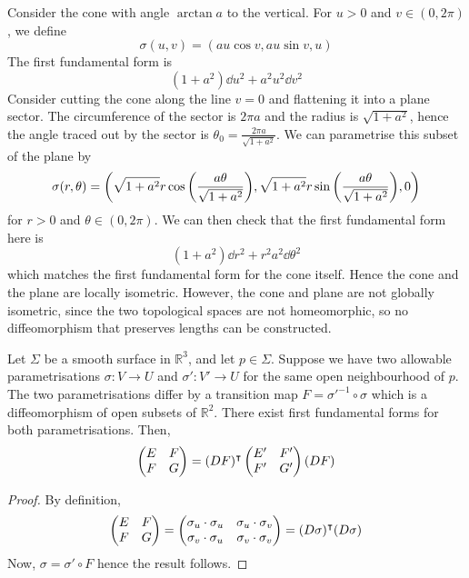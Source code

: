 \begin{example}
	Consider the cone with angle \( \arctan a \) to the vertical.
	For \( u > 0 \) and \( v \in (0,2\pi) \), we define
	\[
		\sigma(u,v) = (au\cos v, au\sin v, u)
	\]
	The first fundamental form is
	\[
		(1+a^2)\dd{u}^2 + a^2 u^2 \dd{v}^2
	\]
	Consider cutting the cone along the line \( v = 0 \) and flattening it into a plane sector.
	The circumference of the sector is \( 2 \pi a \) and the radius is \( \sqrt{1+a^2} \), hence the angle traced out by the sector is \( \theta_0 = \frac{2 \pi a}{\sqrt{1+a^2}} \).
	We can parametrise this subset of the plane by
	\[
		\sigma(r,\theta) = \qty(\sqrt{1+a^2} r\cos\qty(\frac{a\theta}{\sqrt{1+a^2}}), \sqrt{1+a^2} r\sin\qty(\frac{a\theta}{\sqrt{1+a^2}}), 0)
	\]
	for \( r > 0 \) and \( \theta \in (0,2\pi) \).
	We can then check that the first fundamental form here is
	\[
		(1+a^2) \dd{r}^2 + r^2 a^2 \dd{\theta}^2
	\]
	which matches the first fundamental form for the cone itself.
	Hence the cone and the plane are locally isometric.
	However, the cone and plane are not globally isometric, since the two topological spaces are not homeomorphic, so no diffeomorphism that preserves lengths can be constructed.
\end{example}
\begin{lemma}
	Let \( \Sigma \) be a smooth surface in \( \mathbb R^3 \), and let \( p \in \Sigma \).
	Suppose we have two allowable parametrisations \( \sigma \colon V \to U \) and \( \sigma' \colon V' \to U \) for the same open neighbourhood of \( p \).
	The two parametrisations differ by a transition map \( F = {\sigma'}^{-1} \circ \sigma \) which is a diffeomorphism of open subsets of \( \mathbb R^2 \).
	There exist first fundamental forms for both parametrisations.
	Then,
	\[
		\begin{pmatrix}
			E & F \\
			F & G
		\end{pmatrix} = (DF)^\intercal \begin{pmatrix}
			E' & F' \\
			F' & G'
		\end{pmatrix} (DF)
	\]
\end{lemma}
\begin{proof}
	By definition,
	\[
		\begin{pmatrix}
			E & F \\
			F & G
		\end{pmatrix} = \begin{pmatrix}
			\sigma_u \cdot \sigma_u & \sigma_u \cdot \sigma_v \\
			\sigma_v \cdot \sigma_u & \sigma_v \cdot \sigma_v
		\end{pmatrix} = (D\sigma)^\intercal (D\sigma)
	\]
	Now, \( \sigma = \sigma' \circ F \) hence the result follows.
\end{proof}

